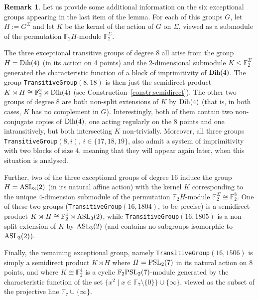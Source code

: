 \documentclass[a4paper]{amsart}
\newcommand{\FF}{\mathbb{F}}
\newcommand{\PSL}{\rm PSL}
\newcommand{\Dih}{\rm Dih}
\newcommand{\ASL}{\rm ASL}
\theoremstyle{definition}
\newtheorem{remark}[theorem]{Remark}
\begin{document}
\begin{remark}
   Let us provide some additional information on the six exceptional groups appearing in the last item of the lemma. For each of this groups $G$, let
       $H:=G^\Sigma$ and let $K$ be the kernel of the action of $G$ on $\Sigma$,
    viewed as a submodule of the permutation $\FF_2H$-module $\FF_2^\Sigma$.

     The three exceptional transitive groups of degree $8$ all arise from the group $H = \Dih(4)$ (in its action on 4 points) and the $2$-dimensional submodule $K \le \FF_2^\Sigma$ generated the characteristic function of a block of imprimitivity of $\Dih(4)$. The group {\tt TransitiveGroup}$(8,18)$ is then just the semidirect product $K\rtimes H \cong \FF_2^2\rtimes \Dih(4)$ (see Construction~\ref{constr:semidirect}). The other two groups of degree $8$ are both non-split extensions of $K$ by $\Dih(4)$ (that is, in both cases, $K$ has no complement in $G$). Interestingly, both of them
     contain two non-conjugate copies of $\Dih(4)$, one acting regularly on the 8 points and one intransitively, but both intersecting $K$ non-trivially. Moreover,
     all three groups {\tt TransitiveGroup}$(8,i)$, $i\in\{17,18,19\}$, also admit a system of imprimitivity with two blocks of size $4$, meaning that they will appear again later, when this situation is analysed.

     Further, two of the three exceptional groups of degree $16$ induce the group $H=\ASL_3(2)$ (in its natural affine action) with the kernel $K$ corresponding to the unique $4$-dimension submodule of the permutation $\FF_2H$-module $\FF_2^\Sigma \cong \FF_2^8$.
     One of these two groups ({\tt TransitiveGroup}$(16,1804)$, to be precise) is a semidirect product $K\rtimes H \cong \FF_2^4\rtimes\ASL_3(2)$, while {\tt TransitiveGroup}$(16,1805)$ is a non-split extension of $K$ by $\ASL_3(2)$ (and contains no subgroups isomorphic to $\ASL_3(2)$).

     Finally, the remaining exceptional group, namely {\tt TransitiveGroup}$(16,1506)$
     is simply a semidirect product $K\rtimes H$
     where $H=\PSL_2(7)$ in its natural action on $8$ points, and where $K\cong \FF_2^4$ is a cyclic $\FF_2\PSL_2(7)$-module generated by the characteristic function of the set $\{x^2 \mid x \in \FF_7\setminus\{0\}\} \cup \{\infty\}$, viewed as the subset of the projective line $\FF_7 \cup \{\infty\}$.  
\end{remark}
\end{document}
